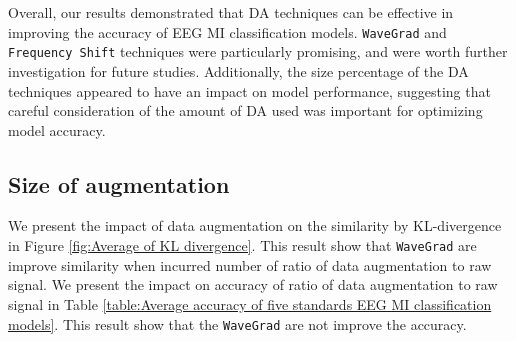 \documentclass[runningheads]{llncs}
\begin{document}
Overall, our results demonstrated that DA techniques can be effective in improving the accuracy of EEG MI classification models. \texttt{WaveGrad} and \texttt{Frequency Shift} techniques were particularly promising, and were worth further investigation for future studies. Additionally, the size percentage of the DA techniques appeared to have an impact on model performance, suggesting that careful consideration of the amount of DA used was important for optimizing model accuracy. 

\begin{table}[ht] 
\centering
\caption{\label{table:Average accuracy of five standards EEG MI classification models} Average accuracy of five standards EEG MI classification models}
\end{table}

\subsection{Size of augmentation}
We present the impact of data augmentation on the similarity by KL-divergence in Figure \ref{fig:Average of KL divergence}. This result show that \texttt{WaveGrad} are improve similarity when incurred number of ratio of data augmentation to raw signal.
We present the impact on accuracy of ratio of data augmentation to raw signal  in Table \ref{table:Average accuracy of five standards EEG MI classification models}. This result show that the \texttt{WaveGrad} are not improve the accuracy.
\end{document}
